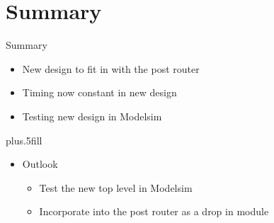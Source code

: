 \documentclass{beamer}
\begin{document}
\section*{Summary}

\begin{frame}{Summary}

  \begin{itemize}
  \item
    New design to fit in with the post router
  \item
    Timing now constant in new design
  \item
    Testing new design in Modelsim
  \end{itemize}

  \vskip0pt plus.5fill
  \begin{itemize}
  \item
    Outlook
    \begin{itemize}
    \item
      Test the new top level in Modelsim
    \item
      Incorporate into the post router as a drop in module
    \end{itemize}
  \end{itemize}
\end{frame}
\end{document}
